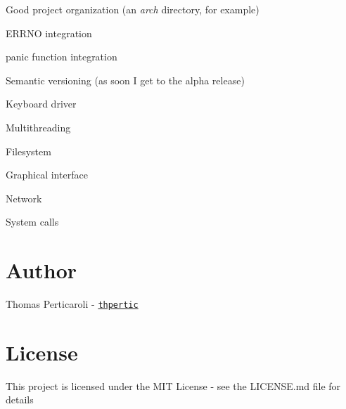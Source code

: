 \begin{DoxyItemize}
\item Good project organization (an {\itshape arch} directory, for example)
\item E\+R\+R\+NO integration
\item panic function integration
\item Semantic versioning (as soon I get to the alpha release)
\item Keyboard driver
\item Multithreading
\item Filesystem
\item Graphical interface
\item Network
\item System calls
\end{DoxyItemize}\hypertarget{index_Author}{}\section{Author}\label{index_Author}
Thomas Perticaroli -\/ \href{https://github.com/thpertic}{\tt thpertic}\hypertarget{index_License}{}\section{License}\label{index_License}
This project is licensed under the M\+IT License -\/ see the L\+I\+C\+E\+N\+SE.md file for details 